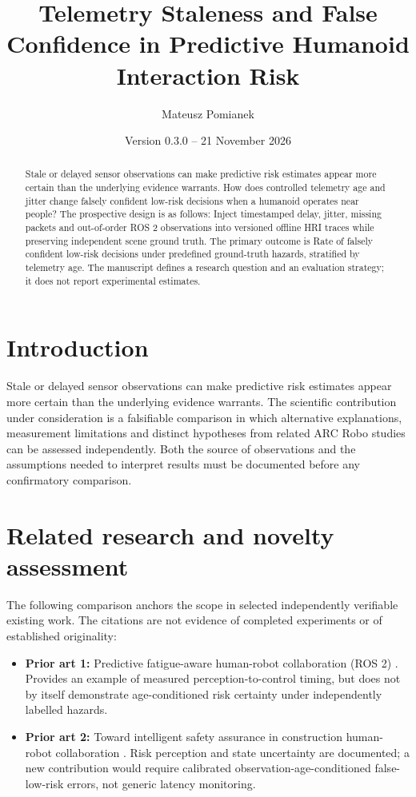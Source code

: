 \documentclass[11pt,a4paper]{article}
\title{Telemetry Staleness and False Confidence in Predictive Humanoid Interaction Risk}
\author{Mateusz Pomianek}
\date{Version 0.3.0 -- 21 November 2026}
\begin{document}
\maketitle

\begin{abstract}
Stale or delayed sensor observations can make predictive risk estimates appear more certain than the underlying evidence warrants. How does controlled telemetry age and jitter change falsely confident low-risk decisions when a humanoid operates near people? The prospective design is as follows: Inject timestamped delay, jitter, missing packets and out-of-order ROS 2 observations into versioned offline HRI traces while preserving independent scene ground truth. The primary outcome is Rate of falsely confident low-risk decisions under predefined ground-truth hazards, stratified by telemetry age. The manuscript defines a research question and an evaluation strategy; it does not report experimental estimates.
\end{abstract}

\section{Introduction}
Stale or delayed sensor observations can make predictive risk estimates appear more certain than the underlying evidence warrants. The scientific contribution under consideration is a falsifiable comparison in which alternative explanations, measurement limitations and distinct hypotheses from related ARC Robo studies can be assessed independently. Both the source of observations and the assumptions needed to interpret results must be documented before any confirmatory comparison.

\section{Related research and novelty assessment}
The following comparison anchors the scope in selected independently verifiable existing work. The citations are not evidence of completed experiments or of established originality:
\begin{itemize}
\item \textbf{Prior art 1:} Predictive fatigue-aware human-robot collaboration (ROS 2) \cite{source1}. Provides an example of measured perception-to-control timing, but does not by itself demonstrate age-conditioned risk certainty under independently labelled hazards.
\item \textbf{Prior art 2:} Toward intelligent safety assurance in construction human-robot collaboration \cite{source2}. Risk perception and state uncertainty are documented; a new contribution would require calibrated observation-age-conditioned false-low-risk errors, not generic latency monitoring.
\end{itemize}
\end{document}
